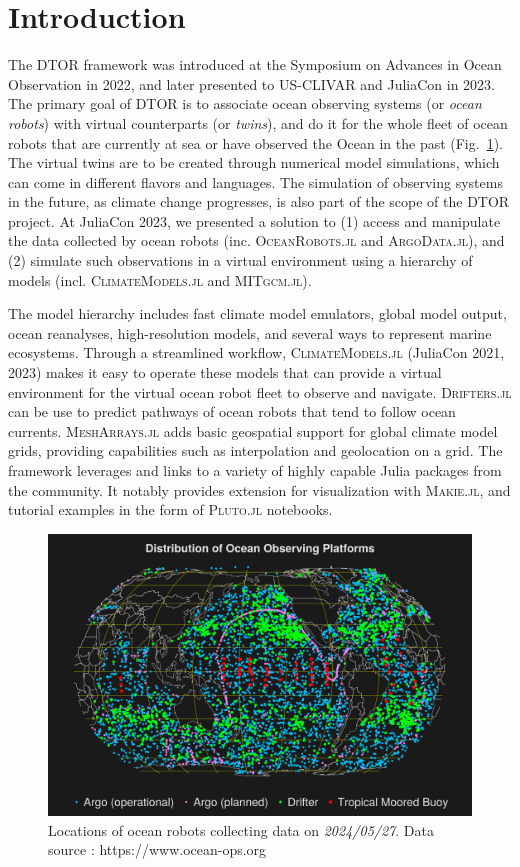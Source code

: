 \documentclass{juliacon}[12pt]
\newcommand{\pkg}[1]{{\small \textsc{#1}}}
\begin{document}
\section{Introduction}

The DTOR framework was introduced at the Symposium on Advances in Ocean Observation in 2022, and later presented to US-CLIVAR and JuliaCon in 2023. The primary goal of DTOR is to associate ocean observing systems (or {\it ocean robots}) with virtual counterparts (or {\it twins}), and do it for the whole fleet of ocean robots that are currently at sea or have observed the Ocean in the past (Fig.~\ref{fig:ocean-ops}). The virtual twins are to be created through numerical model simulations, which can come in different flavors and languages. The simulation of observing systems in the future, as climate change progresses, is also part of the scope of the DTOR project. At JuliaCon 2023, we presented a solution to (1) access and manipulate the data collected by ocean robots (inc. \pkg{OceanRobots.jl} and \pkg{ArgoData.jl}), and (2) simulate such observations in a virtual environment using a hierarchy of models (incl. \pkg{ClimateModels.jl} and \pkg{MITgcm.jl}).

The model hierarchy includes fast climate model emulators, global model output, ocean reanalyses, high-resolution models, and several ways to represent marine ecosystems. Through a streamlined workflow, \pkg{ClimateModels.jl} (JuliaCon 2021, 2023) makes it easy to operate these models that can provide a virtual environment for the virtual ocean robot fleet to observe and navigate. \pkg{Drifters.jl} \cite{Forget2021} can be use to predict pathways of ocean robots that tend to follow ocean currents. \pkg{MeshArrays.jl} adds basic geospatial support for global climate model grids, providing capabilities such as interpolation and geolocation on a grid. The framework leverages and links to a variety of highly capable Julia packages from the community. It notably provides extension for visualization with \pkg{Makie.jl}, and tutorial examples in the form of \pkg{Pluto.jl} notebooks.

\begin{figure}[t]
\centerline{\includegraphics[width=\columnwidth]{figs/20240528_OceanOPS.png}}
\caption{Locations of ocean robots collecting data on {\it 2024/05/27}. Data source : https://www.ocean-ops.org}
\label{fig:ocean-ops}
\end{figure}
\end{document}
